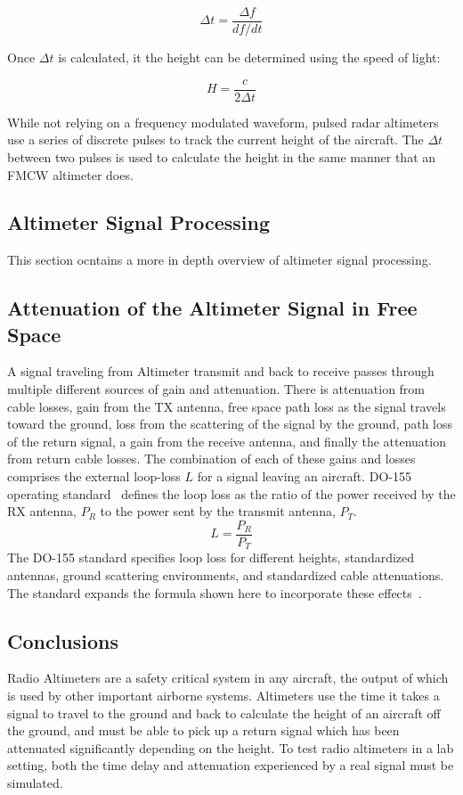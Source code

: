 $$\Delta t = \frac{\Delta f}{df/dt}$$

Once $\Delta t$ is calculated, it the height can be determined using the speed of light: 

$$H = \frac{c}{2\Delta t} $$

While not relying on a frequency modulated waveform, pulsed radar altimeters use a series of discrete pulses to track the current height of the aircraft. The $\Delta t$ between two pulses is used to calculate the height in the same manner that an FMCW altimeter does. 

\subsection{Altimeter Signal Processing}
This section ocntains a more in depth overview of altimeter signal processing. 


\subsection{Attenuation of the Altimeter Signal in Free Space}
A signal traveling from Altimeter transmit and back to receive passes through multiple different sources of gain and attenuation. There is attenuation from cable losses, gain from the TX antenna, free space path loss as the signal travels toward the ground, loss from the scattering of the signal by the ground, path loss of the return signal, a gain from the receive antenna, and finally the attenuation from return cable losses. The combination of each of these gains and losses comprises the external loop-loss $L$ for a signal leaving an aircraft. DO-155 operating standard~\cite{noauthor_minimum_1974} defines the loop loss as the ratio of the power received by the RX antenna, $P_R$ to the power sent by the transmit antenna, $P_T$.
$$ L = \frac{P_R}{P_T}$$
The DO-155 standard specifies loop loss for different heights, standardized antennas,  ground scattering environments, and standardized cable attenuations. The standard expands the formula shown here to incorporate these effects~\cite{noauthor_minimum_1974}.
\subsection{Conclusions}
Radio Altimeters are a safety critical system in any aircraft, the output of which is used by other important airborne systems. Altimeters use the time it takes a signal to travel to the ground and back to calculate the height of an aircraft off the ground, and must be able to pick up a return signal which has been attenuated significantly depending on the height. To test radio altimeters in a lab setting, both the time delay and attenuation experienced by a real signal must be simulated. 
